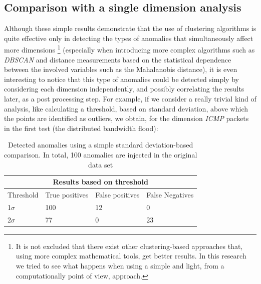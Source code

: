 \documentclass[12pt,a4paper,cucitura]{toptesi}
\begin{document}
\subsection{Comparison with a single dimension analysis}

Although these simple results demonstrate that the use of clustering algorithms is quite effective only in detecting the types of anomalies that simultaneously affect more dimensions \footnote{It is not excluded that there exist other clustering-based approaches that, using more complex mathematical tools, get better results. In this research we tried to see what happens when using a simple and light, from a computationally point of view, approach.} (especially when introducing more complex algorithms such as \emph{DBSCAN} and distance measurements based on  the statistical dependence between the involved variables such as the Mahalanobis distance), it is even interesting to notice that this type of anomalies could be detected simply by considering each dimension independently, and possibly correlating the results later, as a post processing step.
For example, if we consider a really trivial kind of analysis, like calculating a threshold, based on standard deviation, above which the points are identified as outliers, we obtain, for the dimension \emph{ICMP} packets in the first test (the distributed bandwidth flood):

\begin{table}
\centering
\begin{tabular}{l|l|l|l}
\hline
\hline
\multicolumn{4}{c}{Results based on threshold} \\
\hline
Threshold & True positives & False positives & False Negatives \\
\hline
1$\sigma$ & 100 & 12 & 0 \\
2$\sigma$ & 77 & 0 & 23 \\
\hline
\hline
\end{tabular}
\caption[Bandwidth flood - detected anomalies using standard deviation]{Detected anomalies using a simple standard deviation-based comparison. In total, 100 anomalies are injected in the original data set}
\end{table}
\end{document}
